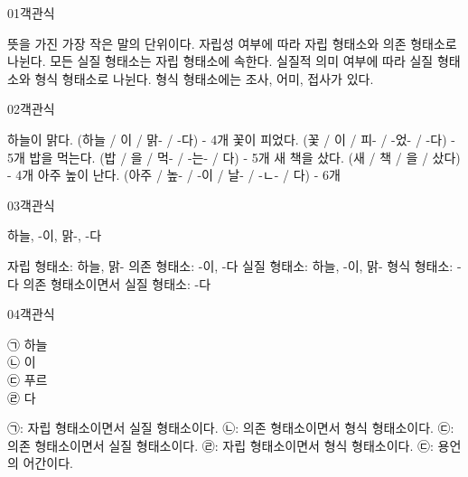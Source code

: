 \documentclass[fs9,seriesRus]{korfarm-base}
\begin{document}
\par\medskip
\kfBeginMC
\begin{kfQBlock}{01}{객관식}
\begin{kfChoices}
\kfChoice 뜻을 가진 가장 작은 말의 단위이다.
\kfChoice 자립성 여부에 따라 자립 형태소와 의존 형태소로 나뉜다.
\kfChoice 모든 실질 형태소는 자립 형태소에 속한다.
\kfChoice 실질적 의미 여부에 따라 실질 형태소와 형식 형태소로 나뉜다.
\kfChoice 형식 형태소에는 조사, 어미, 접사가 있다.
\end{kfChoices}
\end{kfQBlock}
\begin{kfQBlock}{02}{객관식}
\begin{kfChoices}
\kfChoice 하늘이 맑다. (하늘 / 이 / 맑- / -다) - 4개
\kfChoice 꽃이 피었다. (꽃 / 이 / 피- / -었- / -다) - 5개
\kfChoice 밥을 먹는다. (밥 / 을 / 먹- / -는- / 다) - 5개
\kfChoice 새 책을 샀다. (새 / 책 / 을 / 샀다) - 4개
\kfChoice 아주 높이 난다. (아주 / 높- / -이 / 날- / -ㄴ- / 다) - 6개
\end{kfChoices}
\end{kfQBlock}
\begin{kfQBlock}{03}{객관식}
\begin{kfEvidence}하늘, -이, 맑-, -다\end{kfEvidence}
\begin{kfChoices}
\kfChoice 자립 형태소: 하늘, 맑-
\kfChoice 의존 형태소: -이, -다
\kfChoice 실질 형태소: 하늘, -이, 맑-
\kfChoice 형식 형태소: -다
\kfChoice 의존 형태소이면서 실질 형태소: -다
\end{kfChoices}
\end{kfQBlock}
\begin{kfQBlock}{04}{객관식}
\begin{kfEvidence}㉠ 하늘 \\\relax
㉡ 이 \\\relax
㉢ 푸르 \\\relax
㉣ 다\end{kfEvidence}
\begin{kfChoices}
\kfChoice ㉠: 자립 형태소이면서 실질 형태소이다.
\kfChoice ㉡: 의존 형태소이면서 형식 형태소이다.
\kfChoice ㉢: 의존 형태소이면서 실질 형태소이다.
\kfChoice ㉣: 자립 형태소이면서 형식 형태소이다.
\kfChoice ㉢: 용언의 어간이다.
\end{kfChoices}
\end{kfQBlock}
\end{document}
